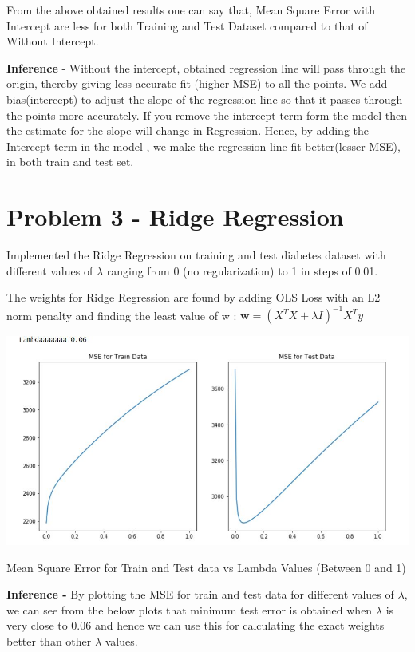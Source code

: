 \documentclass[12pt]{extarticle}
\begin{document}
\vspace{5mm}
From the above obtained results one can say that, Mean Square Error with Intercept are less for both Training and Test Dataset compared to that of Without Intercept.

\vspace{3mm}
\textbf{Inference} - Without the intercept, obtained regression line will pass through the origin, thereby giving less accurate fit (higher MSE) to all the points. We add bias(intercept) to adjust the slope of the regression line so that it passes through the points more accurately. If you remove the intercept term form the model then the estimate for the slope will change in Regression. Hence, by adding the Intercept term in the model , we make the regression line fit better(lesser MSE), in both train and test set.

\newpage
\section{Problem 3 - Ridge Regression}

Implemented the Ridge Regression on training and test diabetes dataset with different values of $\lambda$ ranging from 0 (no regularization) to 1 in steps of 0.01. 

\vspace{3 mm}
The weights for Ridge Regression are found by adding OLS Loss with an L2 norm penalty and finding the least value of w :
${\boldsymbol  w } = (X^TX + \lambda I)^{-1}X^Ty$

\begin{center}
  \centering
  \includegraphics[width=\textwidth]{Q3.JPG}
  \caption{Mean Square Error for Train and Test data vs Lambda Values (Between 0 and 1)}
\end{center}

\textbf{Inference -} By plotting the MSE for train and test data for different values of $\lambda$, we can see from the below plots that minimum test error is obtained when $\lambda$ is very close to 0.06 and hence we can use this for calculating the exact weights better than other $\lambda$ values.
\end{document}
